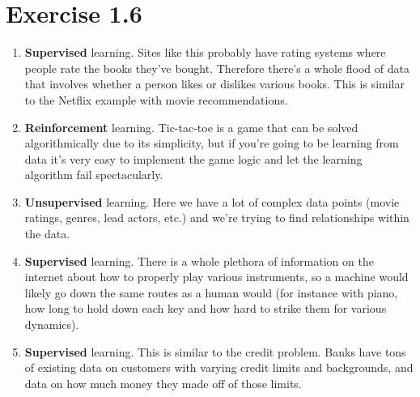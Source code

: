 \documentclass[12pt]{article}
\begin{document}
\section*{Exercise 1.6}
\begin{enumerate}[label=(\alph*)]
	\item \textbf{Supervised} learning. Sites like this probably have rating systems where people rate the books they've bought. Therefore there's a whole flood of data that involves whether a person likes or dislikes various books. This is similar to the Netflix example with movie recommendations.
	\item \textbf{Reinforcement} learning. Tic-tac-toe is a game that can be solved algorithmically due to its simplicity, but if you're going to be learning from data it's very easy to implement the game logic and let the learning algorithm fail spectacularly.
	\item \textbf{Unsupervised} learning. Here we have a lot of complex data points (movie ratings, genres, lead actors, etc.) and we're trying to find relationships within the data.
	\item \textbf{Supervised} learning. There is a whole plethora of information on the internet about how to properly play various instruments, so a machine would likely go down the same routes as a human would (for instance with piano, how long to hold down each key and how hard to strike them for various dynamics).
	\item \textbf{Supervised} learning. This is similar to the credit problem. Banks have tons of existing data on customers with varying credit limits and backgrounds, and data on how much money they made off of those limits.
\end{enumerate}
\end{document}
